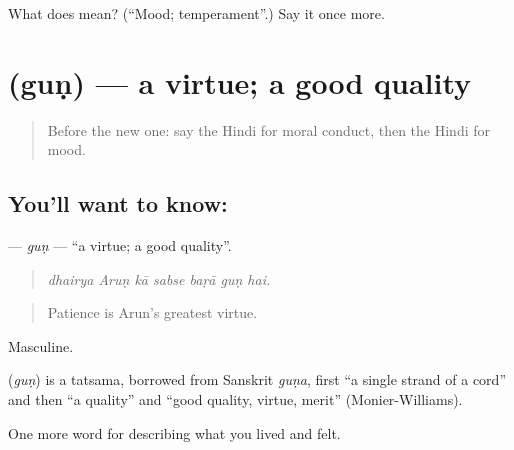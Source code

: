 \begin{tcolorbox}[breakable,colback=teal!4,colframe=teal!35!black,title={Before you move on}]
What does  mean? (\textquotedblleft{}Mood; temperament\textquotedblright{}.) Say it once more.
\end{tcolorbox}
\section[\texorpdfstring{\hi{गुण} (guṇ)}{गुण (guṇ)}]{ (guṇ) — a virtue; a good quality}

\label{lesson:HI-C475-gun}



\begin{quote}
Before the new one: say the Hindi for moral conduct, then the Hindi for mood.
\end{quote}

\subsection*{You'll want to know: }
\textbf{} — \emph{guṇ} — \textquotedblleft{}a virtue; a good quality\textquotedblright{}.

\begin{quote}
      
\end{quote}

\begin{quote}
\emph{dhairya Aruṇ kā sabse baṛā guṇ hai.}
\end{quote}

\begin{quote}
Patience is Arun's greatest virtue.
\end{quote}

Masculine.

\begin{cousinweb}
\textbf{} (\emph{guṇ}) is a tatsama, borrowed from Sanskrit \emph{guṇa}, first \textquotedblleft{}a single strand of a cord\textquotedblright{} and then \textquotedblleft{}a quality\textquotedblright{} and \textquotedblleft{}good quality, virtue, merit\textquotedblright{} (Monier-Williams).
\end{cousinweb}

\begin{grammarlens}[title={What you've built}]
One more word for describing what you lived and felt.
\end{grammarlens}

